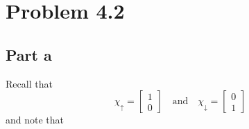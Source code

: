 \documentclass[12pt]{report}
\theoremstyle{custom}
\begin{document}
\section*{Problem 4.2}
\subsection*{Part a}
Recall that 
\begin{equation*}
  \chi_\uparrow = \begin{bmatrix}
    1 \\ 0
  \end{bmatrix} \quad \text{and} \quad \chi_\downarrow = \begin{bmatrix}
    0 \\ 1
    \end{bmatrix}
\end{equation*}
and note that 
\end{document}
